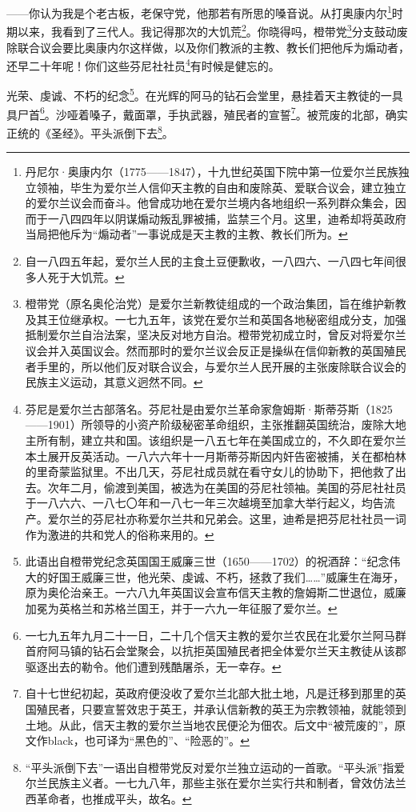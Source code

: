 \par ——你认为我是个老古板，老保守党，他那若有所思的嗓音说。从打奥康内尔\footnote{丹尼尔·奥康内尔（1775——1847），十九世纪英国下院中第一位爱尔兰民族独立领袖，毕生为爱尔兰人信仰天主教的自由和废除英、爱联合议会，建立独立的爱尔兰议会而奋斗。他曾成功地在爱尔兰境内各地组织一系列群众集会，因而于一八四四年以阴谋煽动叛乱罪被捕，监禁三个月。这里，迪希却将英政府当局把他斥为“煽动者”一事说成是天主教的主教、教长们所为。}时期以来，我看到了三代人。我记得那次的大饥荒\footnote{自一八四五年起，爱尔兰人民的主食土豆便歉收，一八四六、一八四七年间很多人死于大饥荒。}。你晓得吗，橙带党\footnote{橙带党（原名奥伦治党）是爱尔兰新教徒组成的一个政治集团，旨在维护新教及其王位继承权。一七九五年，该党在爱尔兰和英国各地秘密组成分支，加强抵制爱尔兰自治法案，坚决反对地方自治。橙带党初成立时，曾反对将爱尔兰议会并入英国议会。然而那时的爱尔兰议会反正是操纵在信仰新教的英国殖民者手里的，所以他们反对联合议会，与爱尔兰人民开展的主张废除联合议会的民族主义运动，其意义迥然不同。}分支鼓动废除联合议会要比奥康内尔这样做，以及你们教派的主教、教长们把他斥为煽动者，还早二十年呢！你们这些芬尼社社员\footnote{芬尼是爱尔兰古部落名。芬尼社是由爱尔兰革命家詹姆斯·斯蒂芬斯（1825——1901）所领导的小资产阶级秘密革命组织，主张推翻英国统治，废除大地主所有制，建立共和国。该组织是一八五七年在美国成立的，不久即在爱尔兰本土展开反英活动。一八六六年十一月斯蒂芬斯因内奸告密被捕，关在都柏林的里奇蒙监狱里。不出几天，芬尼社成员就在看守女儿的协助下，把他救了出去。次年二月，偷渡到美国，被选为在美国的芬尼社领袖。美国的芬尼社社员于一八六六、一八七〇年和一八七一年三次越境至加拿大举行起义，均告流产。爱尔兰的芬尼社亦称爱尔兰共和兄弟会。这里，迪希是把芬尼社社员一词作为激进的共和党人的俗称来用的。}有时候是健忘的。
\par 光荣、虔诚、不朽的纪念\footnote{此语出自橙带党纪念英国国王威廉三世（1650——1702）的祝酒辞：“纪念伟大的好国王威廉三世，他光荣、虔诚、不朽，拯救了我们……”威廉生在海牙，原为奥伦治亲王。一六八九年英国议会宣布信天主教的詹姆斯二世退位，威廉加冕为英格兰和苏格兰国王，并于一六九一年征服了爱尔兰。}。在光辉的阿马的钻石会堂里，悬挂着天主教徒的一具具尸首\footnote{一七九五年九月二十一日，二十几个信天主教的爱尔兰农民在北爱尔兰阿马群首府阿马镇的钻石会堂聚会，以抗拒英国殖民者把全体爱尔兰天主教徒从该郡驱逐出去的勒令。他们遭到残酷屠杀，无一幸存。}。沙哑着嗓子，戴面罩，手执武器，殖民者的宣誓\footnote{自十七世纪初起，英政府便没收了爱尔兰北部大批土地，凡是迁移到那里的英国殖民者，只要宣誓效忠于英王，并承认信新教的英王为宗教领袖，就能领到土地。从此，信天主教的爱尔兰当地农民便沦为佃农。后文中“被荒废的”，原文作black，也可译为“黑色的”、“险恶的”。}。被荒废的北部，确实正统的《圣经》。平头派倒下去\footnote{“平头派倒下去”一语出自橙带党反对爱尔兰独立运动的一首歌。“平头派”指爱尔兰民族主义者。一七九八年，那些主张在爱尔兰实行共和制者，曾效仿法兰西革命者，也推成平头，故名。}。
